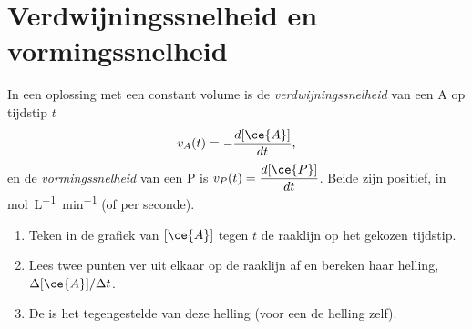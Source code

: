 \section{Verdwijningssnelheid en vormingssnelheid}

\begin{definition}\label{def:g12:reaction-rates:rate}
In een oplossing met een constant volume is de
\emph{verdwijningssnelheid}
van een  A op tijdstip $t$
\[
  v_A(t) = -\frac{d[\ce{A}]}{dt},
\]
en de \emph{vormingssnelheid} van een
 P is $v_P(t) = \dfrac{d[\ce{P}]}{dt}$. Beide zijn positief,
in \si{mol.L^{-1}.min^{-1}} (of per seconde).
\end{definition}


\begin{method}\label{met:g12:reaction-rates:tangent}
\begin{enumerate}
  \item Teken in de grafiek van $[\ce{A}]$ tegen $t$ de raaklijn op het
        gekozen tijdstip.
  \item Lees twee punten ver uit elkaar op de raaklijn af en bereken haar
        helling, $\Delta[\ce{A}] / \Delta t$.
  \item De  is het tegengestelde van deze helling
        (voor een  de helling zelf).
\end{enumerate}
\end{method}

